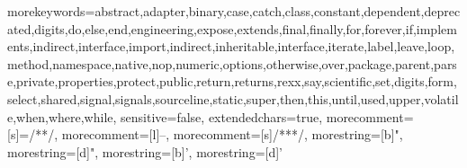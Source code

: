 {morekeywords={abstract,adapter,binary,case,catch,class,constant,dependent,deprecated,digits,do,else,end,engineering,expose,extends,final,finally,for,forever,if,implements,indirect,interface,import,indirect,inheritable,interface,iterate,label,leave,loop,method,namespace,native,nop,numeric,options,otherwise,over,package,parent,parse,private,properties,protect,public,return,returns,rexx,say,scientific,set,digits,form,select,shared,signal,signals,sourceline,static,super,then,this,until,used,upper,volatile,when,where,while},
sensitive=false,
extendedchars=true,
morecomment=[s]={/*}{*/},
morecomment=[l]{--},
morecomment=[s]{/**}{*/},
morestring=[b]",
morestring=[d]",
morestring=[b]',
morestring=[d]'}


